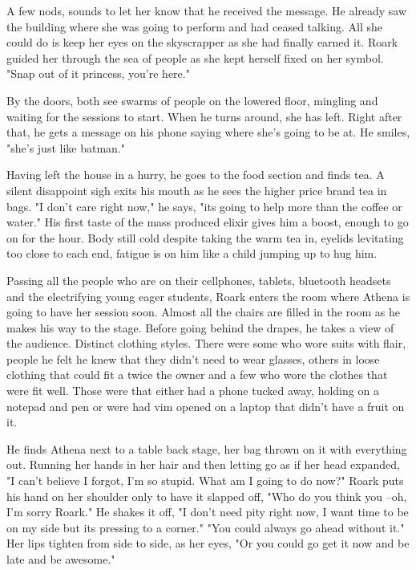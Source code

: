         A few nods, sounds to let her know that he received the message. He already saw the building where she was going to perform and had
    ceased talking. All she could do is keep her eyes on the skyscrapper as she had finally earned it. Roark guided her through the sea of people
    as she kept herself fixed on her symbol. "Snap out of it princess, you're here."

        By the doors, both see swarms of people on the lowered floor, mingling and waiting for the sessions to start. When he turns around, she
    has left. Right after that, he gets a message on his phone saying where she's going to be at. He smiles, "she's just like batman." 

        Having left the house in a hurry, he goes to the food section and finds tea. A silent disappoint sigh exits his mouth as he sees the
    higher price brand tea in bags. "I don't care right now," he says, "its going to help more than the coffee or water." His first taste of
    the mass produced elixir gives him a boost, enough to go on for the hour. Body still cold despite taking the warm tea in, eyelids levitating
    too close to each end, fatigue is on him like a child jumping up to hug him.

        Passing all the people who are on their cellphones, tablets, bluetooth headsets and the electrifying young eager students, Roark enters
    the room where Athena is going to have her session soon. Almost all the chairs are filled in the room as he makes his way to the stage. Before
    going behind the drapes, he takes a view of the audience. Distinct clothing styles. There were some who wore suits with flair, people
    he felt he knew that they didn't need to wear glasses, others in loose clothing that could fit a twice the owner and a few who wore the 
    clothes that were fit well. Those were that either had a phone tucked away, holding on a notepad and pen or were had vim opened on a 
    laptop that didn't have a fruit on it.

        He finds Athena next to a table back stage, her bag thrown on it with everything out. Running her hands in her hair and then letting
    go as if her head expanded, "I can't believe I forgot, I'm so stupid. What am I going to do now?" Roark puts his hand on her shoulder only
    to have it slapped off, "Who do you think you --oh, I'm sorry Roark." He shakes it off, "I don't need pity right now, I want time to be on
    my side but its pressing to a corner." "You could always go ahead without it." Her lips tighten from side to side, as her eyes, "Or you
    could go get it now and be late and be awesome." 


